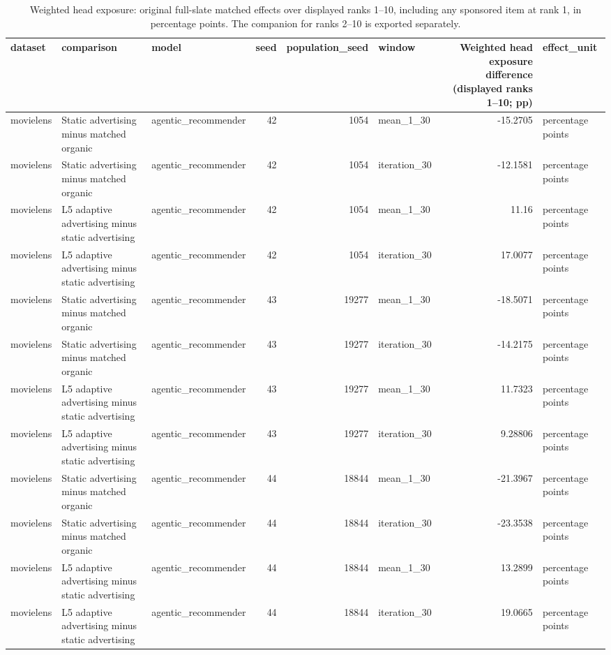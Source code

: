 \begin{table}[htbp!]
\centering
\small
\setlength{\tabcolsep}{3pt}
\renewcommand{\arraystretch}{1.1}
\begin{tabular}{lllrrlrl}
\hline
dataset & comparison & model & seed & population\_seed & window & Weighted head exposure difference (displayed ranks 1–10; pp) & effect\_unit \\
\hline
movielens & Static advertising minus matched organic & agentic\_recommender & 42 & 1054 & mean\_1\_30 & -15.2705 & percentage points \\
movielens & Static advertising minus matched organic & agentic\_recommender & 42 & 1054 & iteration\_30 & -12.1581 & percentage points \\
movielens & L5 adaptive advertising minus static advertising & agentic\_recommender & 42 & 1054 & mean\_1\_30 & 11.16 & percentage points \\
movielens & L5 adaptive advertising minus static advertising & agentic\_recommender & 42 & 1054 & iteration\_30 & 17.0077 & percentage points \\
movielens & Static advertising minus matched organic & agentic\_recommender & 43 & 19277 & mean\_1\_30 & -18.5071 & percentage points \\
movielens & Static advertising minus matched organic & agentic\_recommender & 43 & 19277 & iteration\_30 & -14.2175 & percentage points \\
movielens & L5 adaptive advertising minus static advertising & agentic\_recommender & 43 & 19277 & mean\_1\_30 & 11.7323 & percentage points \\
movielens & L5 adaptive advertising minus static advertising & agentic\_recommender & 43 & 19277 & iteration\_30 & 9.28806 & percentage points \\
movielens & Static advertising minus matched organic & agentic\_recommender & 44 & 18844 & mean\_1\_30 & -21.3967 & percentage points \\
movielens & Static advertising minus matched organic & agentic\_recommender & 44 & 18844 & iteration\_30 & -23.3538 & percentage points \\
movielens & L5 adaptive advertising minus static advertising & agentic\_recommender & 44 & 18844 & mean\_1\_30 & 13.2899 & percentage points \\
movielens & L5 adaptive advertising minus static advertising & agentic\_recommender & 44 & 18844 & iteration\_30 & 19.0665 & percentage points \\
\hline
\end{tabular}
\caption{Weighted head exposure: original full-slate matched effects over displayed ranks 1--10, including any sponsored item at rank 1, in percentage points. The companion for ranks 2--10 is exported separately.}
\label{chap:results:tab:rq1_advertising_weighted_head_exposure_ranks_1_10_effects}
\end{table}
